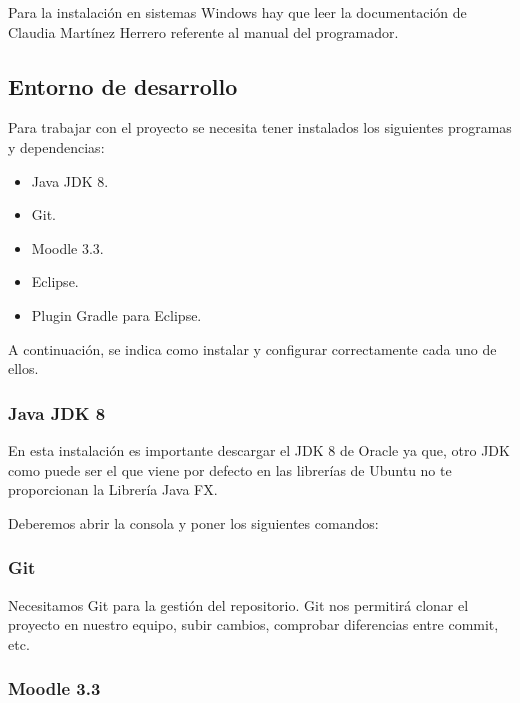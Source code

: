 Para la instalación en sistemas Windows hay que leer la documentación de Claudia Martínez Herrero \cite{claudia:anexo} referente al manual del programador.

\subsection{Entorno de desarrollo}\label{entorno-de-desarrollo}

Para trabajar con el proyecto se necesita tener instalados los
siguientes programas y dependencias:

\begin{itemize}
	\tightlist
	\item
	Java JDK 8.
	\item
	Git.
	\item
	Moodle 3.3.
	\item
	Eclipse.
	\item
	Plugin Gradle para Eclipse.
\end{itemize}

A continuación, se indica como instalar y configurar correctamente cada
uno de ellos.

\subsubsection{Java JDK 8}\label{java-jdk-8}

En esta instalación es importante descargar el JDK 8 de Oracle ya que, otro JDK como puede ser el que viene por defecto en las librerías de Ubuntu no te proporcionan la Librería Java FX.

Deberemos abrir la consola y poner los siguientes comandos:


\subsubsection{Git}\label{git-git}

Necesitamos Git para la gestión del repositorio. Git nos permitirá clonar el proyecto en nuestro equipo, subir cambios, comprobar diferencias entre commit, etc.


\subsubsection{Moodle 3.3}\label{moodle}

